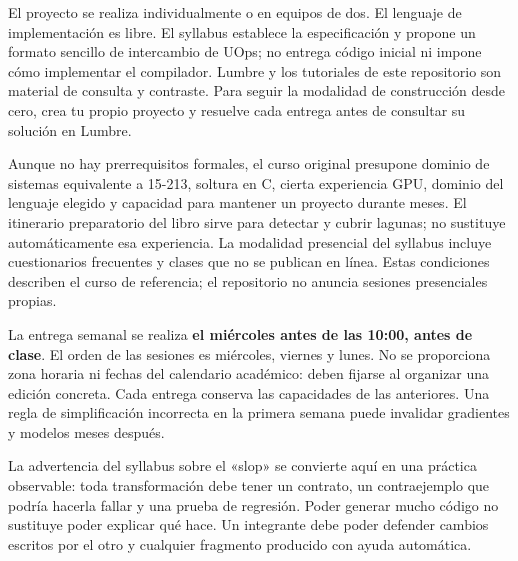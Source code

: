 \documentclass[12pt,a4paper,oneside]{report}
\begin{document}
El proyecto se realiza individualmente o en equipos de dos. El lenguaje de implementación es libre. El syllabus establece la especificación y propone un formato sencillo de intercambio de UOps; no entrega código inicial ni impone cómo implementar el compilador. Lumbre y los tutoriales de este repositorio son material de consulta y contraste. Para seguir la modalidad de construcción desde cero, crea tu propio proyecto y resuelve cada entrega antes de consultar su solución en Lumbre.

Aunque no hay prerrequisitos formales, el curso original presupone dominio de sistemas equivalente a 15-213, soltura en C, cierta experiencia GPU, dominio del lenguaje elegido y capacidad para mantener un proyecto durante meses. El itinerario preparatorio del libro sirve para detectar y cubrir lagunas; no sustituye automáticamente esa experiencia. La modalidad presencial del syllabus incluye cuestionarios frecuentes y clases que no se publican en línea. Estas condiciones describen el curso de referencia; el repositorio no anuncia sesiones presenciales propias.

La entrega semanal se realiza \textbf{el miércoles antes de las 10:00, antes de clase}. El orden de las sesiones es miércoles, viernes y lunes. No se proporciona zona horaria ni fechas del calendario académico: deben fijarse al organizar una edición concreta. Cada entrega conserva las capacidades de las anteriores. Una regla de simplificación incorrecta en la primera semana puede invalidar gradientes y modelos meses después.

\begin{idea}
La advertencia del syllabus sobre el «slop» se convierte aquí en una práctica observable: toda transformación debe tener un contrato, un contraejemplo que podría hacerla fallar y una prueba de regresión. Poder generar mucho código no sustituye poder explicar qué hace. Un integrante debe poder defender cambios escritos por el otro y cualquier fragmento producido con ayuda automática.

\end{idea}
\end{document}
